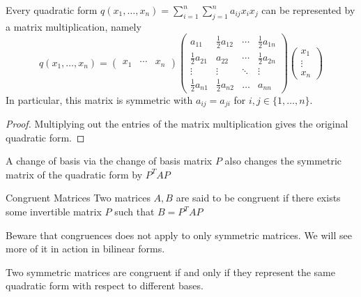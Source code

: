\documentclass[a4paper]{article}
\begin{document}
\begin{prp}{}{} Every quadratic form $q(x_1,\dots,x_n)=\sum_{i=1}^n\sum_{j=1}^na_{ij}x_ix_j$ can be represented by a matrix multiplication, namely $$q(x_1,\dots,x_n)=\begin{pmatrix}x_1 & \cdots & x_n\end{pmatrix}\begin{pmatrix}a_{11} & \frac{1}{2}a_{12} & \cdots & \frac{1}{2}a_{1n}\\
\frac{1}{2}a_{21} & a_{22} & \cdots & \frac{1}{2}a_{2n}\\
\vdots & \vdots & \ddots & \vdots\\
\frac{1}{2}a_{n1} & \frac{1}{2}a_{n2} & \dots & a_{nn}
\end{pmatrix}\begin{pmatrix}x_1 \\ \vdots \\ x_n\end{pmatrix}$$ In particular, this matrix is symmetric with $a_{ij}=a_{ji}$ for $i,j\in\{1,\dots,n\}$. \tcbline
\begin{proof}
Multiplying out the entries of the matrix multiplication gives the original quadratic form. 
\end{proof}
\end{prp}

\begin{prp}{}{} A change of basis via the change of basis matrix $P$ also changes the symmetric matrix of the quadratic form by $P^TAP$
\end{prp}

\begin{defn}{Congruent Matrices}{} Two matrices $A,B$ are said to be congruent if there exists some invertible matrix $P$ such that $B=P^TAP$
\end{defn}

Beware that congruences does not apply to only symmetric matrices. We will see more of it in action in bilinear forms. 

\begin{prp}{}{} Two symmetric matrices are congruent if and only if they represent the same quadratic form with respect to different bases. 
\end{prp}
\end{document}

